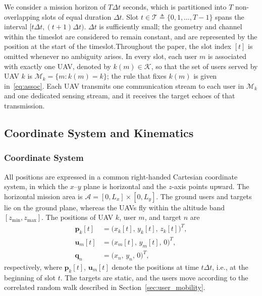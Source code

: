 \documentclass[conference]{IEEEtran}
\begin{document}
We consider a mission horizon of $T\Delta t$ seconds, which is partitioned into $T$ non-overlapping slots of equal duration $\Delta t$. Slot $t\in\mathcal T\triangleq\{0,1,\ldots,T-1\}$ spans the interval $[t\Delta t,(t+1)\Delta t)$. $\Delta t$ is sufficiently small; the geometry and channel within the timeslot are considered to remain constant, and are represented by the position at the start of the timeslot.Throughout the paper, the slot index $[t]$ is omitted whenever no ambiguity arises. In every slot, each user $m$ is associated with exactly one UAV, denoted by $k(m)\in\mathcal K$, so that the set of users served by UAV $k$ is $\mathcal M_k=\{m:k(m)=k\}$; the rule that fixes $k(m)$ is given in~\eqref{eq:assoc}. Each UAV transmits one communication stream to each user in $\mathcal M_k$ and one dedicated sensing stream, and it receives the target echoes of that transmission.




\subsection{Coordinate System and Kinematics}

\subsubsection{Coordinate System}
All positions are expressed in a common right-handed Cartesian coordinate system, in which the $x$--$y$ plane is horizontal and the $z$-axis points upward. The horizontal mission area is $\mathcal A=[0,L_x]\times[0,L_y]$. The ground users and targets lie on the ground plane, whereas the UAVs fly within the altitude band $[z_{\min},z_{\max}]$. The positions of UAV $k$, user $m$, and target $n$ are
\begin{align}
\mathbf p_k[t]&=\big(x_k[t],\,y_k[t],\,z_k[t]\big)^T,\\
\mathbf u_m[t]&=\big(x_m[t],\,y_m[t],\,0\big)^T,\\
\mathbf q_n&=\big(x_n,\,y_n,\,0\big)^T,
\end{align}
respectively, where $\mathbf p_k[t]$, $\mathbf u_m[t]$ denote the positions at time $t\Delta t$, i.e., at the beginning of slot $t$. The targets are static, and the users move according to the correlated random walk described in Section~\ref{sec:user_mobility}.
\end{document}

